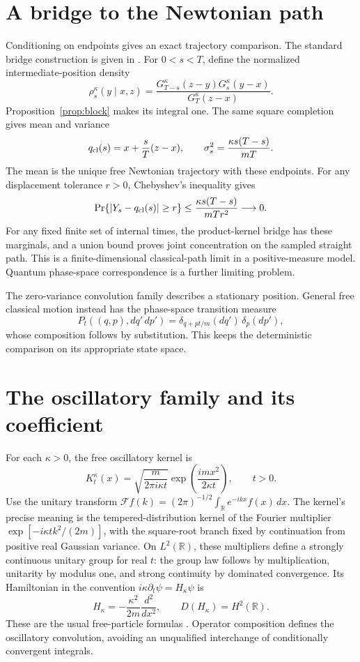 \documentclass[11pt,a4paper]{article}
\begin{document}
\section{A bridge to the Newtonian path}
Conditioning on endpoints gives an exact trajectory comparison. The standard
bridge construction is given in \cite[\S3.4]{PitmanYor2018}.
For $0<s<T$, define the normalized intermediate-position density
\[
 \rho_s^\kappa(y\mid x,z)=
 \frac{G_{T-s}^\kappa(z-y)G_s^\kappa(y-x)}{G_T^\kappa(z-x)}.
\]
Proposition~\ref{prop:block} makes its integral one. The same square completion
gives mean and variance
\begin{equation}\label{eq:bridge}
 q_{\rm cl}(s)=x+\frac{s}{T}(z-x),\qquad
 \sigma_s^2=\frac{\kappa s(T-s)}{mT}.
\end{equation}
The mean is the unique free Newtonian trajectory with these endpoints.
For any displacement tolerance $r>0$, Chebyshev's inequality gives
\[
 \Pr\{|Y_s-q_{\rm cl}(s)|\ge r\}
 \le\frac{\kappa s(T-s)}{mTr^2}\longrightarrow0.
\]
For any fixed finite set of internal times, the product-kernel bridge has these
marginals, and a union bound proves joint concentration on the sampled straight
path. This is a finite-dimensional classical-path limit in a positive-measure
model. Quantum phase-space correspondence is a further limiting problem.

The zero-variance convolution family describes a stationary position. General
free classical motion instead has the phase-space transition measure
\[
 P_t((q,p),dq'\,dp')=
 \delta_{q+pt/m}(dq')\,\delta_p(dp'),
\]
whose composition follows by substitution. This keeps the deterministic
comparison on its appropriate state space.

\section{The oscillatory family and its coefficient}\label{sec:quantum}
For each $\kappa>0$, the free oscillatory kernel is
\[
 K_t^\kappa(x)=\sqrt{\frac{m}{2\pi i\kappa t}}
 \exp\left(\frac{imx^2}{2\kappa t}\right),\qquad t>0.
\]
Use the unitary transform
$\mathcal Ff(k)=(2\pi)^{-1/2}\int_{\mathbb R}e^{-ikx}f(x)\,dx$.
The kernel's precise meaning is the tempered-distribution kernel of the Fourier
multiplier $\exp[-i\kappa t k^2/(2m)]$, with the square-root branch fixed by
continuation from positive real Gaussian variance. On $L^2(\mathbb R)$,
these multipliers define a strongly continuous unitary group for real $t$:
the group law follows by multiplication, unitarity by modulus one, and strong
continuity by dominated convergence. Its Hamiltonian in the convention
$i\kappa\partial_t\psi=H_\kappa\psi$ is
\[
 H_\kappa=-\frac{\kappa^2}{2m}\frac{d^2}{dx^2},
 \qquad D(H_\kappa)=H^2(\mathbb R).
\]
These are the usual free-particle formulas \cite[\S7.3]{Teschl2009}.
Operator composition defines the oscillatory convolution, avoiding an
unqualified interchange of conditionally convergent integrals.
\end{document}
